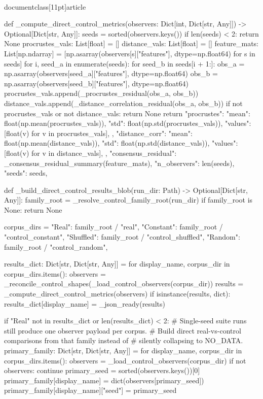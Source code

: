 \\documentclass[11pt]{article}
\begin{document}
\begin{CodeBlock}
def _compute_direct_control_metrics(observers: Dict[int, Dict[str, Any]]) -> Optional[Dict[str, Any]]:
    seeds = sorted(observers.keys())
    if len(seeds) < 2:
        return None
    procrustes_vals: List[float] = []
    distance_vals: List[float] = []
    feature_mats: List[np.ndarray] = [np.asarray(observers[s]["features"], dtype=np.float64) for s in seeds]
    for i, seed_a in enumerate(seeds):
        for seed_b in seeds[i + 1:]:
            obs_a = np.asarray(observers[seed_a]["features"], dtype=np.float64)
            obs_b = np.asarray(observers[seed_b]["features"], dtype=np.float64)
            procrustes_vals.append(_procrustes_residual(obs_a, obs_b))
            distance_vals.append(_distance_correlation_residual(obs_a, obs_b))
    if not procrustes_vals or not distance_vals:
        return None
    return {
        "procrustes": {
            "mean": float(np.mean(procrustes_vals)),
            "std": float(np.std(procrustes_vals)),
            "values": [float(v) for v in procrustes_vals],
        },
        "distance_corr": {
            "mean": float(np.mean(distance_vals)),
            "std": float(np.std(distance_vals)),
            "values": [float(v) for v in distance_vals],
        },
        "consensus_residual": _consensus_residual_summary(feature_mats),
        "n_observers": len(seeds),
        "seeds": seeds,
    }


def _build_direct_control_results_blob(run_dir: Path) -> Optional[Dict[str, Any]]:
    family_root = _resolve_control_family_root(run_dir)
    if family_root is None:
        return None

    corpus_dirs = {
        "Real": family_root / "real",
        "Constant": family_root / "control_constant",
        "Shuffled": family_root / "control_shuffled",
        "Random": family_root / "control_random",
    }

    results_dict: Dict[str, Dict[str, Any]] = {}
    for display_name, corpus_dir in corpus_dirs.items():
        observers = _reconcile_control_shapes(_load_control_observers(corpus_dir))
        results = _compute_direct_control_metrics(observers)
        if isinstance(results, dict):
            results_dict[display_name] = _json_ready(results)

    if "Real" not in results_dict or len(results_dict) < 2:
        # Single-seed suite runs still produce one observer payload per corpus.
        # Build direct real-vs-control comparisons from that family instead of
        # silently collapsing to NO_DATA.
        primary_family: Dict[str, Dict[str, Any]] = {}
        for display_name, corpus_dir in corpus_dirs.items():
            observers = _load_control_observers(corpus_dir)
            if not observers:
                continue
            primary_seed = sorted(observers.keys())[0]
            primary_family[display_name] = dict(observers[primary_seed])
            primary_family[display_name]["seed"] = primary_seed


\end{CodeBlock}
\end{document}
